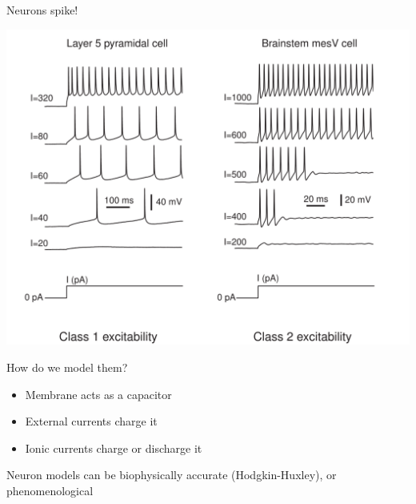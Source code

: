 \documentclass[presentation]{beamer}
\begin{document}
\begin{frame}[label={sec:org16c2285}]{Neurons spike!}
\begin{center}
\includegraphics[height=.8\textheight]{./excitability_classes.png}
\end{center}
\end{frame}

\begin{frame}[label={sec:org346bd99}]{How do we model them?}
\begin{itemize}
\item Membrane acts as a capacitor
\item External currents charge it
\item Ionic currents charge or discharge it
\end{itemize}

\vfill
Neuron models can be biophysically accurate (Hodgkin-Huxley), or phenomenological
\end{frame}
\end{document}
